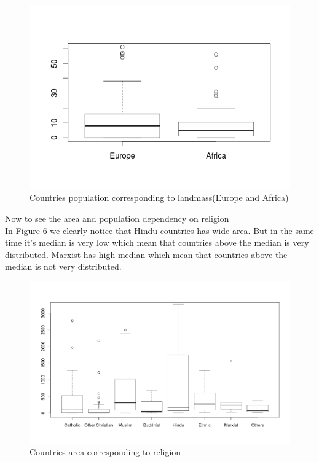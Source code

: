 \documentclass{article}
\begin{document}
	\begin{figure}[H]
		\begin{center}
			\includegraphics[scale=0.95]{boxplotpopulationvslandmass.png} %
		\end{center}
		\caption{Countries population corresponding to landmass(Europe and Africa)} %
	\end{figure}
	Now to see the area and population dependency on religion\\
	In Figure 6 we clearly notice that Hindu countries has wide area. But in the same time it's median is very low which mean that countries above the median is very distributed. Marxist has high median which mean that countries above the median is not very distributed. 
	\begin{figure}[H]
		\begin{center}
			\includegraphics[scale=0.5]{boxplotareavsreligion.png}
		\end{center}
		\caption{Countries area corresponding to religion} %
	\end{figure}
\end{document}
